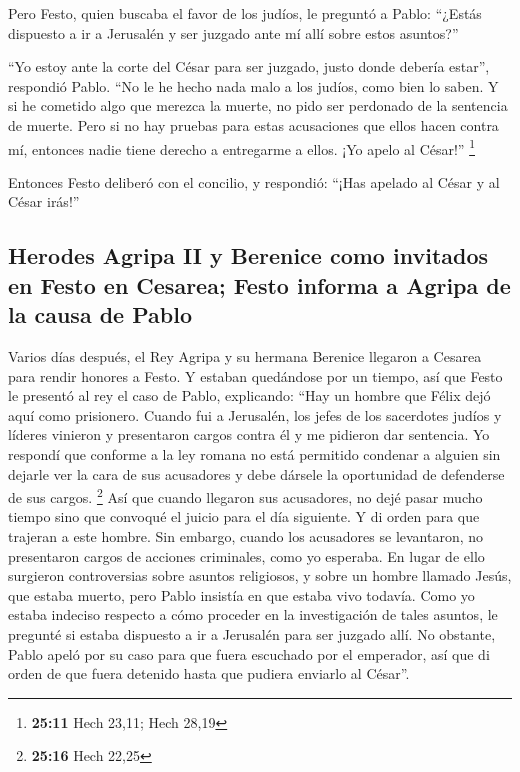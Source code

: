  Pero Festo, quien buscaba el favor de los judíos, le
preguntó a Pablo: ``¿Estás dispuesto a ir a Jerusalén y ser juzgado ante
mí allí sobre estos asuntos?''

 ``Yo estoy ante la corte del César para ser juzgado,
justo donde debería estar'', respondió Pablo. ``No le he hecho nada malo
a los judíos, como bien lo saben.  Y si he cometido algo
que merezca la muerte, no pido ser perdonado de la sentencia de muerte.
Pero si no hay pruebas para estas acusaciones que ellos hacen contra mí,
entonces nadie tiene derecho a entregarme a ellos. ¡Yo apelo al César!''
\footnote{\textbf{25:11} Hech 23,11; Hech 28,19}

 Entonces Festo deliberó con el concilio, y respondió:
``¡Has apelado al César y al César irás!''

\hypertarget{herodes-agripa-ii-y-berenice-como-invitados-en-festo-en-cesarea-festo-informa-a-agripa-de-la-causa-de-pablo}{%
\subsection{Herodes Agripa II y Berenice como invitados en Festo en
Cesarea; Festo informa a Agripa de la causa de
Pablo}\label{herodes-agripa-ii-y-berenice-como-invitados-en-festo-en-cesarea-festo-informa-a-agripa-de-la-causa-de-pablo}}

 Varios días después, el Rey Agripa y su hermana Berenice
llegaron a Cesarea para rendir honores a Festo.  Y
estaban quedándose por un tiempo, así que Festo le presentó al rey el
caso de Pablo, explicando: ``Hay un hombre que Félix dejó aquí como
prisionero.  Cuando fui a Jerusalén, los jefes de los
sacerdotes judíos y líderes vinieron y presentaron cargos contra él y me
pidieron dar sentencia.  Yo respondí que conforme a la
ley romana no está permitido condenar a alguien sin dejarle ver la cara
de sus acusadores y debe dársele la oportunidad de defenderse de sus
cargos. \footnote{\textbf{25:16} Hech 22,25}  Así que
cuando llegaron sus acusadores, no dejé pasar mucho tiempo sino que
convoqué el juicio para el día siguiente. Y di orden para que trajeran a
este hombre.  Sin embargo, cuando los acusadores se
levantaron, no presentaron cargos de acciones criminales, como yo
esperaba.  En lugar de ello surgieron controversias sobre
asuntos religiosos, y sobre un hombre llamado Jesús, que estaba muerto,
pero Pablo insistía en que estaba vivo todavía.  Como yo
estaba indeciso respecto a cómo proceder en la investigación de tales
asuntos, le pregunté si estaba dispuesto a ir a Jerusalén para ser
juzgado allí.  No obstante, Pablo apeló por su caso para
que fuera escuchado por el emperador, así que di orden de que fuera
detenido hasta que pudiera enviarlo al César''.

